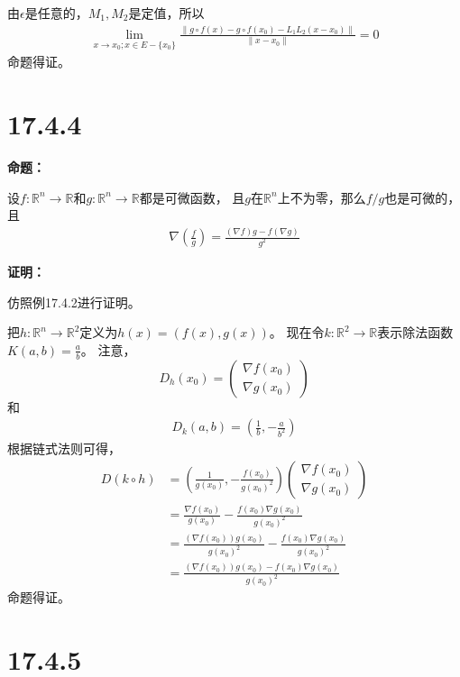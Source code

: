 \documentclass{article}
\begin{document}
由$\epsilon$是任意的，$M_1, M_2$是定值，所以
\begin{align*}
  \lim_{x \to x_0; x \in E - \{x_0\}} \frac{\|g \circ f(x) - g \circ f(x_0) - L_1L_2(x - x_0)\|}{\|x - x_0\|} = 0
\end{align*}
命题得证。

\section*{17.4.4}

\textbf{命题：}

设$f: \mathbb{R}^n \to \mathbb{R}$和$g: \mathbb{R}^n \to \mathbb{R}$都是可微函数，
且$g$在$\mathbb{R}^n$上不为零，那么$f/g$也是可微的，且
\begin{align*}
  \nabla (\frac{f}{g}) = \frac{(\nabla f) g  - f (\nabla g)  }{g^2}
\end{align*}

\textbf{证明：}

仿照例17.4.2进行证明。

把$h: \mathbb{R}^n \to \mathbb{R}^2$定义为$h(x) = (f(x), g(x))$。
现在令$k: \mathbb{R}^2 \to \mathbb{R}$表示除法函数$K(a, b) = \frac{a}{b}$。
注意，
\[
  D_h(x_0) =
  \begin{pmatrix}
    \nabla f(x_0) \\
    \nabla g(x_0)
  \end{pmatrix}
\]
和
\begin{align*}
  D_k(a,b) = (\frac{1}{b}, -\frac{a}{b^2})
\end{align*}
根据链式法则可得，
\begin{align*}
  D(k \circ h)
   & = (\frac{1}{g(x_0)}, -\frac{f(x_0)}{g(x_0)^2})
  \begin{pmatrix}
    \nabla f(x_0) \\
    \nabla g(x_0)
  \end{pmatrix}                                                                      \\
   & = \frac{\nabla f(x_0)}{g(x_0)} - \frac{f(x_0)\nabla g(x_0)}{g(x_0)^2}            \\
   & = \frac{(\nabla f(x_0)) g(x_0)}{g(x_0)^2} - \frac{f(x_0)\nabla g(x_0)}{g(x_0)^2} \\
   & = \frac{(\nabla f(x_0)) g(x_0) - f(x_0)\nabla g(x_0)}{g(x_0)^2}
\end{align*}
命题得证。

\section*{17.4.5}
\end{document}
